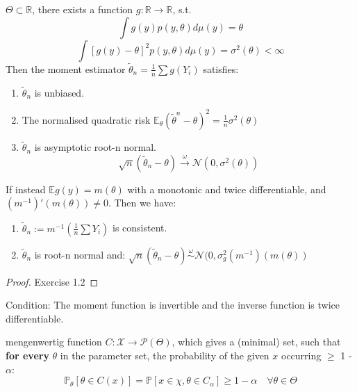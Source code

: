 \begin{theorem}
	$\Theta \subset \mathbb{R}$, there exists a function $g: \mathbb{R} \longrightarrow \mathbb{R}$, s.t.
	\begin{equation*}
		\int g(y) p(y,\theta) d\mu(y) = \theta
	\end{equation*}
	\begin{equation*}
		\int [g(y) - \theta]^2 p(y,\theta) d\mu(y) = \sigma^2(\theta) < \infty
	\end{equation*}
	Then the moment estimator $\tilde{\theta}_n = \frac{1}{n} \sum g(Y_i)$ satisfies:
	\begin{enumerate}
		\item $\tilde{\theta}_n$ is unbiased.
		\item The normalised quadratic risk $ \mathbb{E}_\theta (\tilde{\theta}^n - \theta)^2 = \frac{1}{n} \sigma^2(\theta)$
		\item $\tilde{\theta}_n$ is asymptotic root-n normal.
		\begin{equation*}
			\sqrt{n} (\tilde{\theta}_n - \theta) \overset{\omega}{\longrightarrow} \mathcal{N}(0, \sigma^2(\theta))
		\end{equation*}
	\end{enumerate}
\end{theorem}

\begin{theorem}
	If instead $\mathbb{E} g(y) = m(\theta)$ with a monotonic and twice differentiable, and $(m^{-1})'(m(\theta)) \neq 0$. Then we have:
	\begin{enumerate}
		\item $\tilde{\theta}_n := m^{-1}(\frac{1}{n} \sum Y_i )$ is consistent.
		\item $\tilde{\theta}_n$ is root-n normal and: $\sqrt{n} (\tilde{\theta}_n - \theta) \overset{\omega}{\sim} \mathcal{N}(0, \sigma^2_g (m^{-1})(m(\theta))$
	\end{enumerate}
\end{theorem}

\begin{proof}
	Exercise 1.2
\end{proof}

\begin{remark}
Condition: The moment function is invertible and the inverse function is twice differentiable.	
\end{remark}


\begin{definition}
mengenwertig function  \( C : \mathcal{X} \longrightarrow \mathcal{P}(\Theta) \), which gives a (minimal) set, such that\textbf{ for every} $\theta$ in the parameter set, the probability of the given $x$ occurring $\geq$ 1 - $\alpha$:
\begin{equation}
    \mathbb{P}_{\theta}[\theta \in C(x)] = \mathbb{P} [x \in \chi, \theta \in C_\alpha] \geq 1 - \alpha \quad \forall \theta \in \Theta
\end{equation}
\end{definition}

